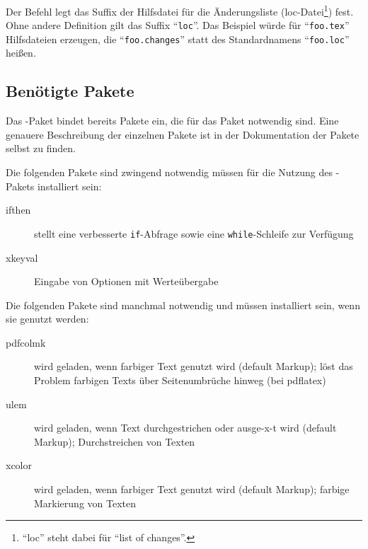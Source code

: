 \subsubsection{}
\DescribeMacro{\setlocextension}

Der Befehl  legt das Suffix der Hilfsdatei für die Änderungsliste (loc-Datei\footnote{%
	"`loc"' steht dabei für "`list of changes"'.
}) fest.
Ohne andere Definition gilt das Suffix "`\texttt{loc}"'.
Das Beispiel würde für "`\texttt{foo.tex}"' Hilfsdateien erzeugen, die "`\texttt{foo.changes}"' statt des Standardnamens "`\texttt{foo.loc}"' heißen.
\begin{einspiel}
	\>
\end{einspiel}
\begin{einspiel}[true]
	\>
\end{einspiel}

\subsection{Benötigte Pakete}
\label{sec:user:packages}

Das -Paket bindet bereits Pakete ein, die für das Paket notwendig sind.
Eine genauere Beschreibung der einzelnen Pakete ist in der Dokumentation der Pakete selbst zu finden.

Die folgenden Pakete sind zwingend notwendig müssen für die Nutzung des -Pakets installiert sein:
\begin{description}
	\item [ifthen] stellt eine verbesserte \texttt{if}-Abfrage sowie eine \texttt{while}-Schleife zur Verfügung
	\item [xkeyval] Eingabe von Optionen mit Werteübergabe
\end{description}

Die folgenden Pakete sind manchmal notwendig und müssen installiert sein, wenn sie genutzt werden:
\begin{description}
	\item [pdfcolmk] wird geladen, wenn farbiger Text genutzt wird (default Markup); löst das Problem farbigen Texts über Seitenumbrüche hinweg (bei pdflatex)
	\item [ulem] wird geladen, wenn Text durchgestrichen oder ausge-x-t wird (default Markup); Durchstreichen von Texten
	\item [xcolor] wird geladen, wenn farbiger Text genutzt wird (default Markup); farbige Markierung von Texten
\end{description}


